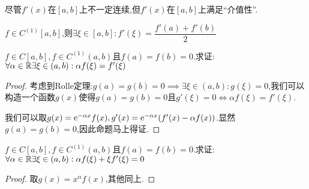 \documentclass[UTF8]{book}
\begin{document}
    尽管$f'(x)$在$[a,b]$上不一定连续,但$f'(x)$在$[a,b]$上满足``介值性''.
    \begin{example}
        $f\in C^{(1)}[a,b]$,则$\exists \xi\in [a,b]: f'(\xi)=\dfrac{f'(a)+f'(b)}{2}$
    \end{example}\begin{example}
        $f\in C[a,b],f\in C^{(1)}(a,b)$且$f(a)=f(b)=0$.求证:$\forall \alpha\in \mathbb{R} \exists \xi\in (a,b):\alpha f(\xi)=f'(\xi)$
    \end{example}\begin{proof}
        考虑到Rolle定理:$g(a)=g(b)=0\implies \exists\xi\in (a,b):g(\xi)=0$,我们可以构造一个函数$g(x)$使得$g(a)=g(b)=0$且$g'(\xi)=0\iff \alpha f(\xi)=f'(\xi)$.

        我们可以取$g(x)=\mathrm{e}^{-\alpha x}f(x),g'(x)=\mathrm{e}^{-\alpha x}(f'(x)-\alpha f(x))$.显然$g(a)=g(b)=0$,因此命题马上得证.
    \end{proof}\begin{example}
        $f\in C[a,b],f\in C^{(1)}(a,b)$且$f(a)=f(b)=0$.求证:$\forall \alpha\in \mathbb{R} \exists \xi\in (a,b):\alpha f(\xi)+\xi f'(\xi)=0$
    \end{example}\begin{proof}
        取$g(x)=x^\alpha f(x)$,其他同上.
    \end{proof}
\end{document}
